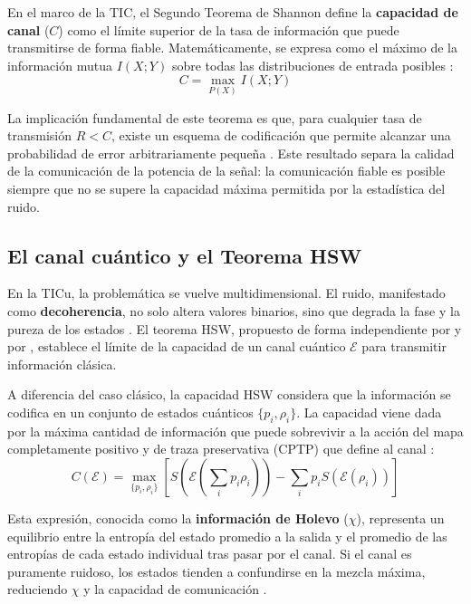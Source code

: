 \documentclass[11pt,a4paper,spanish]{book}
\begin{document}
En el marco de la TIC, el Segundo Teorema de Shannon define la \textbf{capacidad de canal} ($C$) como el límite superior de la tasa de información que puede transmitirse de forma fiable. Matemáticamente, se expresa como el máximo de la información mutua $I(X;Y)$ sobre todas las distribuciones de entrada posibles \citep{shannon1948}:
\begin{equation}
    C = \max_{P(X)} I(X;Y)
\end{equation}

La implicación fundamental de este teorema es que, para cualquier tasa de transmisión $R < C$, existe un esquema de codificación que permite alcanzar una probabilidad de error arbitrariamente pequeña \citep{fano1961}. Este resultado separa la calidad de la comunicación de la potencia de la señal: la comunicación fiable es posible siempre que no se supere la capacidad máxima permitida por la estadística del ruido.

\subsection{El canal cuántico y el Teorema HSW}

En la TICu, la problemática se vuelve multidimensional. El ruido, manifestado como \textbf{decoherencia}, no solo altera valores binarios, sino que degrada la fase y la pureza de los estados \citep{nielsen2010}. El teorema HSW, propuesto de forma independiente por \citet{holevo1973} y por \citet{schumacher1997}, establece el límite de la capacidad de un canal cuántico $\mathcal{E}$ para transmitir información clásica.

A diferencia del caso clásico, la capacidad HSW considera que la información se codifica en un conjunto de estados cuánticos $\{p_i, \rho_i\}$. La capacidad viene dada por la máxima cantidad de información que puede sobrevivir a la acción del mapa completamente positivo y de traza preservativa (CPTP) que define al canal \citep{schumacher1997}:
\begin{equation}
    C(\mathcal{E}) = \max_{\{p_i, \rho_i\}} \left[ S\left( \mathcal{E}\left( \sum_i p_i \rho_i \right) \right) - \sum_i p_i S(\mathcal{E}(\rho_i)) \right]
\end{equation}

Esta expresión, conocida como la \textbf{información de Holevo} ($\chi$), representa un equilibrio entre la entropía del estado promedio a la salida y el promedio de las entropías de cada estado individual tras pasar por el canal. Si el canal es puramente ruidoso, los estados tienden a confundirse en la mezcla máxima, reduciendo $\chi$ y la capacidad de comunicación \citep{holevo1973}.
\end{document}
